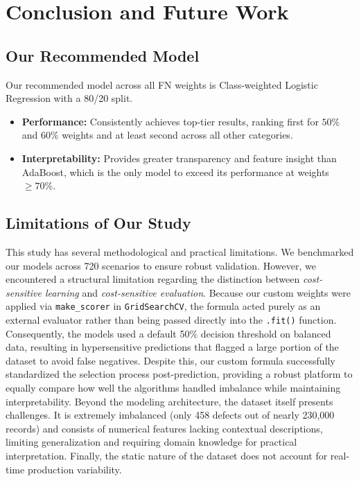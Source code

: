 \documentclass{article}
\begin{document}
\section{Conclusion and Future Work}

\subsection{Our Recommended Model}

Our recommended model across all FN weights is Class-weighted Logistic Regression with a 80/20 split.

\begin{itemize}
    \item \textbf{Performance:} Consistently achieves top-tier results, ranking first for $50\%$ and $60\%$ weights and at least second across all other categories.
    \item \textbf{Interpretability:} Provides greater transparency and feature insight than AdaBoost, which is the only model to exceed its performance at weights $\ge 70\%$.
\end{itemize}

\subsection{Limitations of Our Study} 
This study has several methodological and practical limitations. We benchmarked our models across 720 scenarios to ensure robust validation. However, we encountered a structural limitation regarding the distinction between \textit{cost-sensitive learning} and \textit{cost-sensitive evaluation}. Because our custom weights were applied via \texttt{make\_scorer} in \texttt{GridSearchCV}, the formula acted purely as an external evaluator rather than being passed directly into the \texttt{.fit()} function. Consequently, the models used a default 50\% decision threshold on balanced data, resulting in hypersensitive predictions that flagged a large portion of the dataset to avoid false negatives. Despite this, our custom formula successfully standardized the selection process post-prediction, providing a robust platform to equally compare how well the algorithms handled imbalance while maintaining interpretability. Beyond the modeling architecture, the dataset itself presents challenges. It is extremely imbalanced (only 458 defects out of nearly 230,000 records) and consists of numerical features lacking contextual descriptions, limiting generalization and requiring domain knowledge for practical interpretation. Finally, the static nature of the dataset does not account for real-time production variability. 
\end{document}
